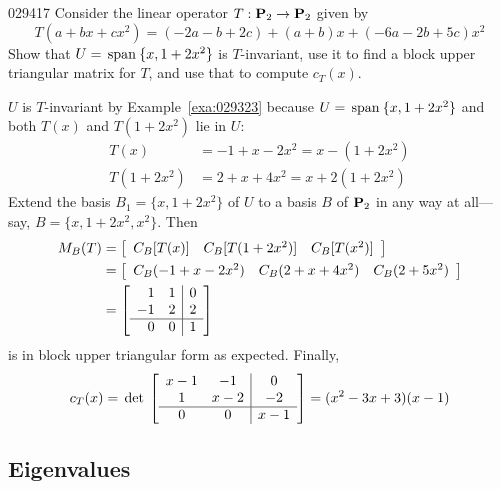 \begin{example}{}{029417}
Consider the linear operator $T : \textbf{P}_{2} \to \textbf{P}_{2}$ given by
\begin{equation*}
T(a + bx + cx^2) = (-2a - b + 2c) + (a + b)x + (-6a -2b + 5c)x^2
\end{equation*}
Show that $U = \thinspace\operatorname{span\medspace}\{x, 1 + 2x^{2}\}$ is $T$-invariant, use it to find a block upper triangular matrix for $T$, and use that to compute $c_{T}(x)$.


\begin{solution}
$U$ is $T$-invariant by Example~\ref{exa:029323} because $U = \thinspace\operatorname{span\medspace}\{x, 1 + 2x^{2}\}$ and both $T(x)$ and $T(1 + 2x^{2})$ lie in $U$:
\begin{align*}
T(x) & = -1 + x - 2x^2 = x - (1 + 2x^2) \\
T(1 + 2x^2) & = 2 + x + 4x^2 = x + 2(1 + 2x^2)
\end{align*}
Extend the basis $B_{1} = \{x, 1 + 2x^{2}\}$ of $U$ to a basis $B$ of $\textbf{P}_{2}$ in any way at all---say, $B = \{x, 1 + 2x^{2}, x^{2}\}$. Then
\begin{align*}
M_B(T) & = \left[ \begin{array}{ccc} C_B[T(x)] & C_B[T(1 + 2x^2)] & C_B[T(x^2)] \end{array} \right] \\
& = \left[ \begin{array}{ccc} C_B(-1 + x - 2x^2) & C_B(2 + x + 4x^2) & C_B(2 + 5x^2) \end{array} \right] \\
& = \left[ \begin{array}{rr|r} 1 & 1 & 0 \\ -1 & 2 & 2 \\ \hline 0 & 0 & 1 \end{array} \right]
\end{align*}
is in block upper triangular form as expected. Finally,
\begin{equation*}
c_T(x) = \thinspace\operatorname{det \medspace} \left[ \begin{array}{cc|c} x - 1 & -1 & 0 \\ 1 & x - 2 & -2 \\ \hline 0 & 0 & x - 1 \end{array} \right] = (x^2 - 3x + 3)(x - 1)
\end{equation*}
\end{solution}
\end{example}

\subsection*{Eigenvalues}


